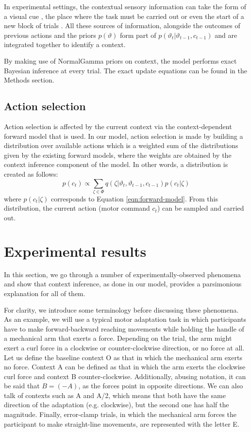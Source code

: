 \documentclass[a4paper,doc,floatsintext,natbib]{apa6}
\def \eref #1{Equation \ref{#1}}   %
\begin{document}
In experimental settings, the contextual sensory information can take the form of a visual cue \cite[e.g.][]{Lee_Dual_2009,Kim_Neural_2015}, the place where the task must be carried out \cite[e.g.][]{Forano_Timescales_2020,Shadmehr_Adaptive_1994} or even the start of a new block of trials \cite{Ethier_Spontaneous_2008}. All these sources of information, alongside the outcomes of previous actions and the priors $p(\vartheta)$ form part of $p(\vartheta_t | \vartheta_{t-1}, c_{t-1})$ and are integrated together to identify a context.

By making use of NormalGamma priors on context, the model performs exact Bayesian inference at every trial. The exact update equations can be found in the Methods section.

\subsection{Action selection}
Action selection is affected by the current context via the context-dependent forward model that is used. In our model, action selection is made by building a distribution over available actions which is a weighted sum of the distributions given by the existing forward models, where the weights are obtained by the context inference component of the model. In other words, a distribution is created as follows:
\begin{equation}
p(c_t) \propto \displaystyle\sum_{\zeta \in \Phi}q(\zeta | \vartheta_t, \vartheta_{t-1}, c_{t-1}) p(c_t | \zeta)
\end{equation}
where $p(c_t | \zeta)$ corresponds to \eref{eqn:forward-model}. From this distribution, the current action (motor command $c_t$) can be sampled and carried out.

\section{Experimental results}
In this section, we go through a number of experimentally-observed phenomena and show that context inference, as done in our model, provides a parsimonious explanation for all of them.

For clarity, we introduce some terminology before discussing these phenomena. As an example, we will use a typical motor adaptation task in which participants have to make forward-backward reaching movements while holding the handle of a mechanical arm that exerts a force. Depending on the trial, the arm might exert a curl force in a clockwise or counter-clockwise direction, or no force at all. Let us define the baseline context O as that in which the mechanical arm exerts no force. Context A can be defined as that in which the arm exerts the clockwise curl force and context B counter-clockwise. Additionally, abusing notation, it can be said that $B = (-A)$, as the forces point in opposite directions. We can also talk of contexts such as A and A/2, which means that both have the same direction of the adaptation (e.g. clockwise), but the second one has half the magnitude. Finally, error-clamp trials, in which the mechanical arm forces the participant to make straight-line movements, are represented with the letter E.
\end{document}
